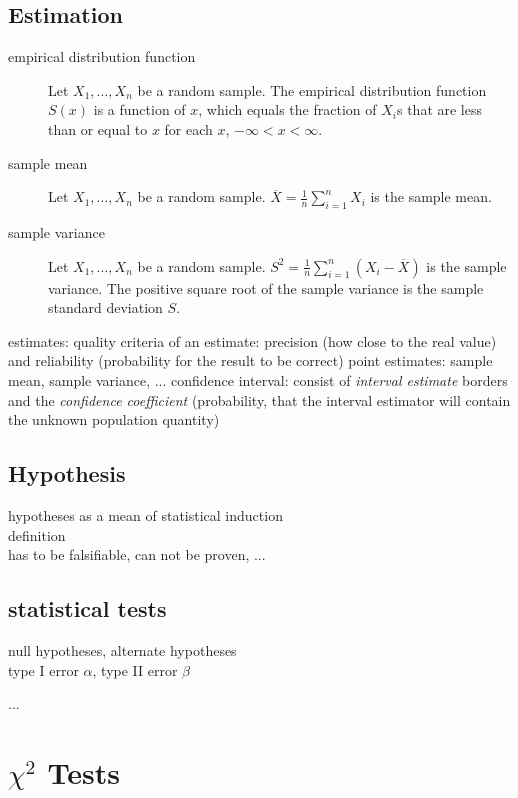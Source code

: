 \documentclass{article}
\begin{document}
\subsection{Estimation}
\begin{description}
	\item[empirical distribution function] Let $X_1, \ldots, X_n$ be a random sample. The empirical distribution function $S(x)$ is a function of $x$, which equals the fraction of $X_i$s that are less than or equal to $x$ for each $x$, $-\infty<x<\infty$.
	\item[sample mean] Let $X_1, \ldots, X_n$ be a random sample. $\overline{X} = \frac{1}{n}\sum_{i=1}^{n}X_i$ is the sample mean.
	\item[sample variance] Let $X_1, \ldots, X_n$ be a random sample. $S^2 = \frac{1}{n}\sum_{i=1}^{n}(X_i-\overline{X})$ is the sample variance. The positive square root of the sample variance is the sample standard deviation $S$.
	\item[]
\end{description}

	estimates:
	quality criteria of an estimate: precision (how close to the real value) and reliability (probability for the result to be correct)
	point estimates: sample mean, sample variance, ...
	confidence interval: consist of \emph{interval estimate} borders and the \emph{confidence coefficient} (probability, that the interval estimator will contain the unknown population quantity)

\subsection{Hypothesis}
	hypotheses as a mean of statistical induction \\
	definition \\
	has to be falsifiable, can not be proven, ...\\



\subsection{statistical tests}
	null hypotheses, alternate hypotheses \\
	type I error $\alpha$, type II error $\beta$


...

\section{$\chi^2$ Tests}
\end{document}
